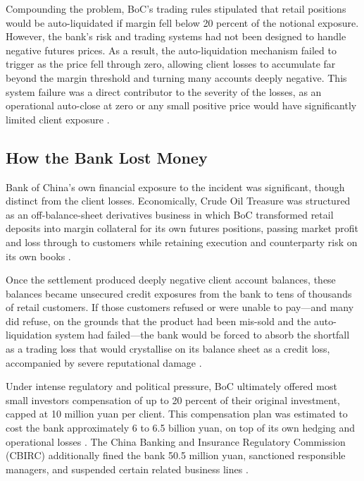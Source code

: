 \documentclass[a4paper,11pt]{article}
\begin{document}
Compounding the problem, BoC's trading rules stipulated that retail
positions would be auto-liquidated if margin fell below 20 percent of
the notional exposure. However, the bank's risk and trading systems
had not been designed to handle negative futures prices. As a result,
the auto-liquidation mechanism failed to trigger as the price fell
through zero, allowing client losses to accumulate far beyond the
margin threshold and turning many accounts deeply negative. This
system failure was a direct contributor to the severity of the
losses, as an operational auto-close at zero or any small positive
price would have significantly limited client exposure
\cite{atlantis2022casestudy}.

\subsection{How the Bank Lost Money}

Bank of China's own financial exposure to the incident was
significant, though distinct from the client losses. Economically,
Crude Oil Treasure was structured as an off-balance-sheet derivatives
business in which BoC transformed retail deposits into margin
collateral for its own futures positions, passing market profit and
loss through to customers while retaining execution and counterparty
risk on its own books \cite{bloomberg2020losses}.

Once the settlement produced deeply negative client account balances,
these balances became unsecured credit exposures from the bank to
tens of thousands of retail customers. If those customers refused or
were unable to pay---and many did refuse, on the grounds that the
product had been mis-sold and the auto-liquidation system had
failed---the bank would be forced to absorb the shortfall as a
trading loss that would crystallise on its balance sheet as a credit
loss, accompanied by severe reputational damage \cite{bloomberg2020losses}.

Under intense regulatory and political pressure, BoC ultimately
offered most small investors compensation of up to 20 percent of
their original investment, capped at 10 million yuan per client. This
compensation plan was estimated to cost the bank approximately 6 to
6.5 billion yuan, on top of its own hedging and operational losses
\cite{caixin2020mulls}. The China Banking and Insurance Regulatory
Commission (CBIRC) additionally fined the bank 50.5 million yuan,
sanctioned responsible managers, and suspended certain related
business lines \cite{reuters2020fined}.
\end{document}
